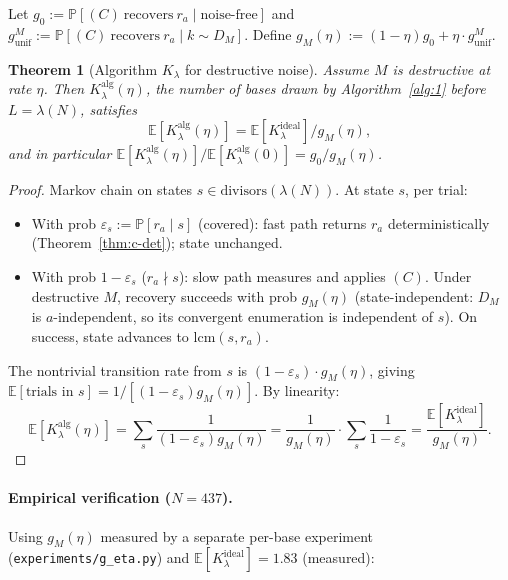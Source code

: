 \documentclass[11pt]{article}
\newtheorem{theorem}{Theorem}
\begin{document}
Let $g_0 := \mathbb{P}[(C)\ \text{recovers}\ r_a \mid \text{noise-free}]$ and $g_{\text{unif}}^M := \mathbb{P}[(C)\ \text{recovers}\ r_a \mid k \sim D_M]$. Define $g_M(\eta) := (1-\eta) g_0 + \eta \cdot g_{\text{unif}}^M$.

\begin{theorem}[Algorithm $K_\lambda$ for destructive noise]\label{thm:k-lambda-alg}
Assume $M$ is destructive at rate $\eta$. Then $K_\lambda^{\text{alg}}(\eta)$, the number of bases drawn by Algorithm~\ref{alg:1} before $L = \lambda(N)$, satisfies
\[
  \mathbb{E}[K_\lambda^{\text{alg}}(\eta)] = \mathbb{E}[K_\lambda^{\text{ideal}}] / g_M(\eta),
\]
and in particular $\mathbb{E}[K_\lambda^{\text{alg}}(\eta)] / \mathbb{E}[K_\lambda^{\text{alg}}(0)] = g_0 / g_M(\eta)$.
\end{theorem}

\begin{proof}
Markov chain on states $s \in \mathrm{divisors}(\lambda(N))$. At state $s$, per trial:
\begin{itemize}
  \item With prob $\varepsilon_s := \mathbb{P}[r_a \mid s]$ (covered): fast path returns $r_a$ deterministically (Theorem~\ref{thm:c-det}); state unchanged.
  \item With prob $1 - \varepsilon_s$ ($r_a \nmid s$): slow path measures and applies $(C)$. Under destructive $M$, recovery succeeds with prob $g_M(\eta)$ (state-independent: $D_M$ is $a$-independent, so its convergent enumeration is independent of $s$). On success, state advances to $\mathrm{lcm}(s, r_a)$.
\end{itemize}

The nontrivial transition rate from $s$ is $(1 - \varepsilon_s) \cdot g_M(\eta)$, giving $\mathbb{E}[\text{trials in }s] = 1/[(1-\varepsilon_s) g_M(\eta)]$. By linearity:
\[
  \mathbb{E}[K_\lambda^{\text{alg}}(\eta)]
    = \sum_s \frac{1}{(1-\varepsilon_s) g_M(\eta)}
    = \frac{1}{g_M(\eta)} \cdot \sum_s \frac{1}{1-\varepsilon_s}
    = \frac{\mathbb{E}[K_\lambda^{\text{ideal}}]}{g_M(\eta)}.
\]
\end{proof}

\paragraph{Empirical verification ($N = 437$).} Using $g_M(\eta)$ measured by a separate per-base experiment (\texttt{experiments/g\_eta.py}) and $\mathbb{E}[K_\lambda^{\text{ideal}}] = 1.83$ (measured):
\end{document}
